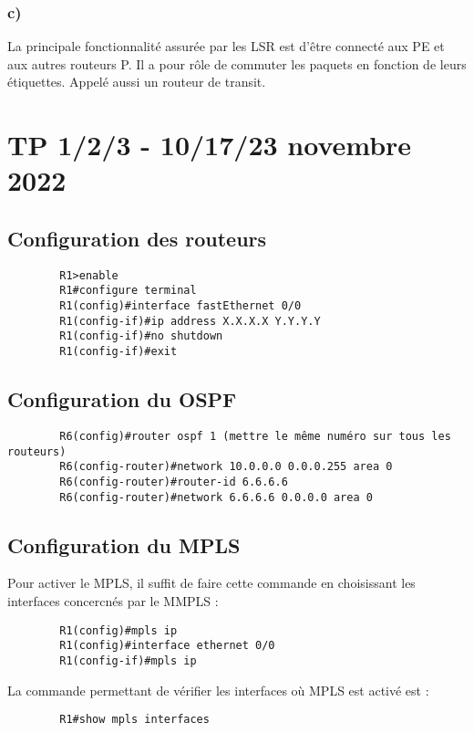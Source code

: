 \documentclass[12pt, a4paper]{article}
\begin{document}
    \subsubsection{c)}
    La principale fonctionnalité assurée par les LSR est d'être connecté aux 
    PE et aux autres routeurs P. Il a pour rôle de commuter les paquets en 
    fonction de leurs étiquettes. Appelé aussi un routeur de transit.

\newpage

\section{TP 1/2/3 - 10/17/23 novembre 2022}
\subsection{Configuration des routeurs}
    \begin{verbatim}
        R1>enable
        R1#configure terminal
        R1(config)#interface fastEthernet 0/0
        R1(config-if)#ip address X.X.X.X Y.Y.Y.Y
        R1(config-if)#no shutdown
        R1(config-if)#exit
    \end{verbatim}

\subsection{Configuration du OSPF}
    \begin{verbatim}
        R6(config)#router ospf 1 (mettre le même numéro sur tous les routeurs)
        R6(config-router)#network 10.0.0.0 0.0.0.255 area 0
        R6(config-router)#router-id 6.6.6.6
        R6(config-router)#network 6.6.6.6 0.0.0.0 area 0
    \end{verbatim}


\subsection{Configuration du MPLS}
Pour activer le MPLS, il suffit de faire cette commande en choisissant les 
interfaces concercnés par le MMPLS :
    \begin{verbatim}
        R1(config)#mpls ip
        R1(config)#interface ethernet 0/0
        R1(config-if)#mpls ip
    \end{verbatim}

La commande permettant de vérifier les interfaces où MPLS est activé est :
    \begin{verbatim}
        R1#show mpls interfaces
    \end{verbatim}
\end{document}
